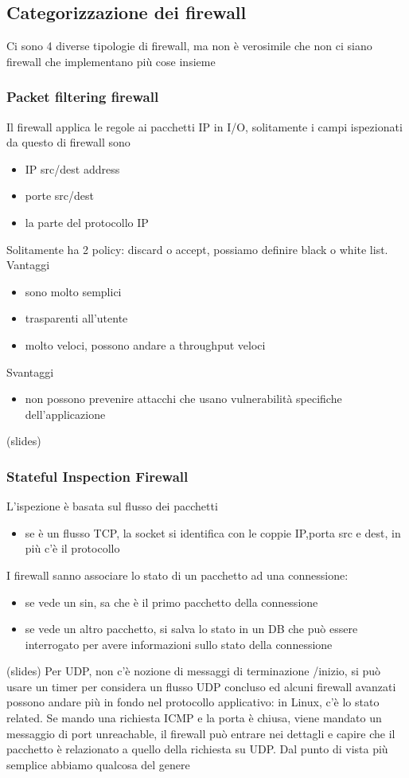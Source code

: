 \documentclass[12pt, oneside]{extbook} %
\begin{document}
\subsection{Categorizzazione dei firewall}
Ci sono 4 diverse tipologie di firewall, ma non è verosimile che non ci siano firewall che implementano più cose insieme
\subsubsection{Packet filtering firewall}
Il firewall applica le regole ai pacchetti IP in I/O, solitamente i campi ispezionati da questo di firewall sono
\begin{itemize}
\item IP src/dest address
\item porte src/dest
\item la parte del protocollo IP
\end{itemize}
Solitamente ha 2 policy: discard o accept, possiamo definire black o white list. Vantaggi
\begin{itemize}
\item sono molto semplici
\item trasparenti all'utente
\item molto veloci, possono andare a throughput veloci
\end{itemize}
Svantaggi
\begin{itemize}
\item non possono prevenire attacchi che usano vulnerabilità specifiche dell'applicazione
\end{itemize}
(slides)
\subsubsection{Stateful Inspection Firewall}
L'ispezione è basata sul flusso dei pacchetti
\begin{itemize}
\item se è un flusso TCP, la socket si identifica con le coppie IP,porta src e dest, in più c'è il protocollo
\end{itemize}
I firewall sanno associare lo stato di un pacchetto ad una connessione:
\begin{itemize}
\item se vede un sin, sa che è il primo pacchetto della connessione
\item se vede un altro pacchetto, si salva lo stato in un DB che può essere interrogato per avere informazioni sullo stato della connessione
\end{itemize}
(slides)
Per UDP, non c'è nozione di messaggi di terminazione /inizio, si può usare un timer per considera un flusso UDP concluso ed alcuni firewall avanzati possono andare più in fondo nel protocollo applicativo: in Linux, c'è lo stato related. Se mando una richiesta ICMP e la porta è chiusa, viene mandato un messaggio di port unreachable, il firewall può entrare nei dettagli e capire che il pacchetto è relazionato a quello della richiesta su UDP.
Dal punto di vista più semplice abbiamo qualcosa del genere
\end{document}

